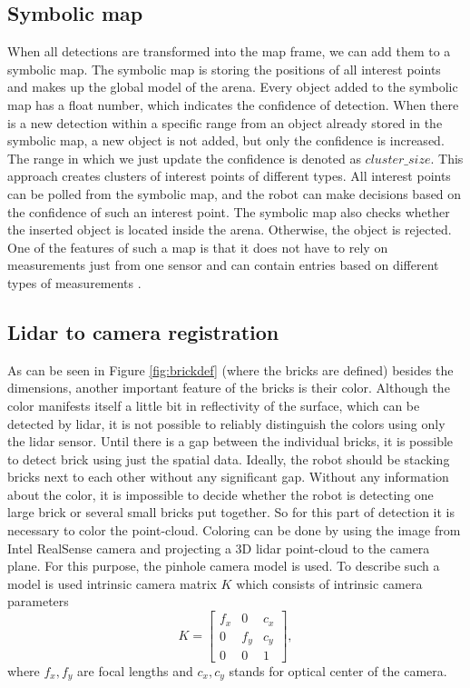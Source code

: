\subsection{Symbolic map}
When all detections are transformed into the map frame, we can add them to a symbolic map. The symbolic map is storing the positions of all interest points and makes up the global model of the arena. Every object added to the symbolic map has a float number, which indicates the confidence of detection. When there is a new detection within a specific range from an object already stored in the symbolic map, a new object is not added, but only the confidence is increased. The range in which we just update the confidence is denoted as $cluster\_size$. This approach creates clusters of interest points of different types. All interest points can be polled from the symbolic map, and the robot can make decisions based on the confidence of such an interest point. The symbolic map also checks whether the inserted object is located inside the arena. Otherwise, the object is rejected. One of the features of such a map is that it does not have to rely on measurements just from one sensor and can contain entries based on different types of measurements \cite{majer2019}.

\subsection{Lidar to camera registration}
As can be seen in Figure \ref{fig:brickdef} (where the bricks are defined) besides the dimensions, another important feature of the bricks is their color. Although the color manifests itself a little bit in reflectivity of the surface, which can be detected by lidar, it is not possible to reliably distinguish the colors using only the lidar sensor. Until there is a gap between the individual bricks, it is possible to detect brick using just the spatial data. Ideally, the robot should be stacking bricks next to each other without any significant gap. Without any information about the color, it is impossible to decide whether the robot is detecting one large brick or several small bricks put together. So for this part of detection it is necessary to color the point-cloud. Coloring can be done by using the image from Intel RealSense camera and projecting a 3D lidar point-cloud to the camera plane. For this purpose, the pinhole camera model is used. To describe such a model is used intrinsic camera matrix $K$ which consists of intrinsic camera parameters \cite{hartley2017}
\begin{equation}
K = \begin{bmatrix}
f_x & 0 & c_x \\
0 & f_y & c_y \\
0 & 0 & 1
\end{bmatrix},
\end{equation}
where $f_x, f_y$ are focal lengths and $c_x, c_y$ stands for optical center of the camera.

